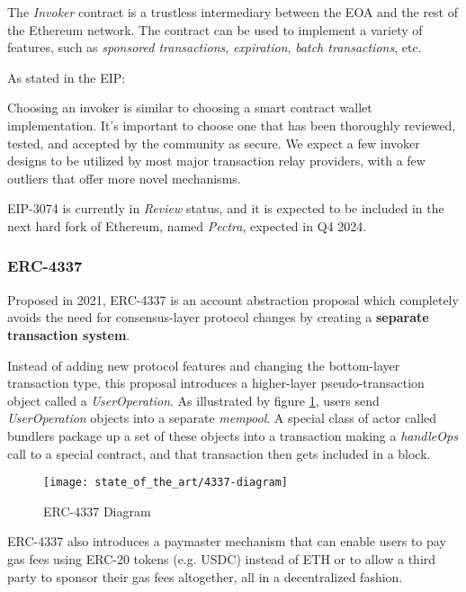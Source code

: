 The \textit{Invoker} contract is a trustless intermediary between the EOA and the rest of the Ethereum network. The contract can be used to implement a variety of features, such as \textit{sponsored transactions}, \textit{expiration}, \textit{batch transactions}, etc. \cite{eip-3074}

As stated in the EIP: \cite{eip-3074}
\begin{displayquote}
    Choosing an invoker is similar to choosing a smart contract wallet implementation. It's important to choose one that has been thoroughly reviewed, tested, and accepted by the community as secure. We expect a few invoker designs to be utilized by most major transaction relay providers, with a few outliers that offer more novel mechanisms.
\end{displayquote}

EIP-3074 is currently in \textit{Review} status, and it is expected to be included in the next hard fork of Ethereum, named \textit{Pectra}, expected in Q4 2024. \cite{pectra-hardfork}

\subsubsection{ERC-4337}
\label{subsubsec:erc-4337}

Proposed in 2021, ERC-4337 is an account abstraction proposal which completely avoids the need for consensus-layer protocol changes by creating a \textbf{separate transaction system}. \cite{eip-4337}

Instead of adding new protocol features and changing the bottom-layer transaction type, this proposal introduces a higher-layer pseudo-transaction object called a \textit{UserOperation}. 
As illustrated by figure \ref{fig:4337-diagram}, users send \textit{UserOperation} objects into a separate \textit{mempool}. A special class of actor called bundlers package up a set of these objects into a transaction making a \textit{handleOps} call to a special contract, and that transaction then gets included in a block. 

\begin{figure}[H]
    \centering
    \texttt{[image: state\_of\_the\_art/4337-diagram]}
    \caption{ERC-4337 Diagram}
    \label{fig:4337-diagram}
\end{figure}


ERC-4337 also introduces a paymaster mechanism that can enable users to pay gas fees using ERC-20 tokens (e.g. USDC) instead of ETH or to allow a third party to sponsor their gas fees altogether, all in a decentralized fashion. \cite{isin-aa-user-experience}

